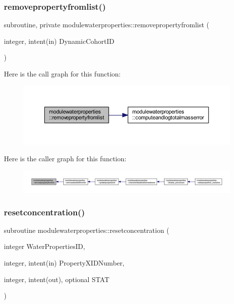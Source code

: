 \subsubsection{\texorpdfstring{removepropertyfromlist()}{removepropertyfromlist()}}
{\footnotesize\ttfamily subroutine, private modulewaterproperties\+::removepropertyfromlist (\begin{DoxyParamCaption}\item[{integer, intent(in)}]{Dynamic\+Cohort\+ID }\end{DoxyParamCaption})\hspace{0.3cm}{\ttfamily [private]}}

Here is the call graph for this function\+:\nopagebreak
\begin{figure}[H]
\begin{center}
\leavevmode
\includegraphics[width=350pt]{namespacemodulewaterproperties_a3d6f2d4c903cf8071d0cba596db412f1_cgraph}
\end{center}
\end{figure}
Here is the caller graph for this function\+:\nopagebreak
\begin{figure}[H]
\begin{center}
\leavevmode
\includegraphics[width=350pt]{namespacemodulewaterproperties_a3d6f2d4c903cf8071d0cba596db412f1_icgraph}
\end{center}
\end{figure}
\mbox{\label{namespacemodulewaterproperties_a09f49ce7e65baca37ff989dd6573e711}} 
\subsubsection{\texorpdfstring{resetconcentration()}{resetconcentration()}}
{\footnotesize\ttfamily subroutine modulewaterproperties\+::resetconcentration (\begin{DoxyParamCaption}\item[{integer}]{Water\+Properties\+ID,  }\item[{integer, intent(in)}]{Property\+X\+I\+D\+Number,  }\item[{integer, intent(out), optional}]{S\+T\+AT }\end{DoxyParamCaption})\hspace{0.3cm}{\ttfamily [private]}}

